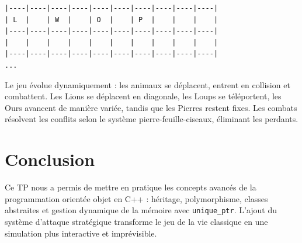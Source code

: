 \documentclass[a4paper,12pt,french]{article}
\begin{document}
\begin{verbatim}
|----|----|----|----|----|----|----|----|----|----|
| L  |    | W  |    | O  |    | P  |    |    |    |
|----|----|----|----|----|----|----|----|----|----|
|    |    |    |    |    |    |    |    |    |    |
|----|----|----|----|----|----|----|----|----|----|
...
\end{verbatim}

Le jeu évolue dynamiquement : les animaux se déplacent, entrent en collision et combattent. Les Lions se déplacent en diagonale, les Loups se téléportent, les Ours avancent de manière variée, tandis que les Pierres restent fixes. Les combats résolvent les conflits selon le système pierre-feuille-ciseaux, éliminant les perdants.

\section{Conclusion}

Ce TP nous a permis de mettre en pratique les concepts avancés de la programmation orientée objet en C++ : héritage, polymorphisme, classes abstraites et gestion dynamique de la mémoire avec \texttt{unique\_ptr}. L'ajout du système d'attaque stratégique transforme le jeu de la vie classique en une simulation plus interactive et imprévisible.
\end{document}

